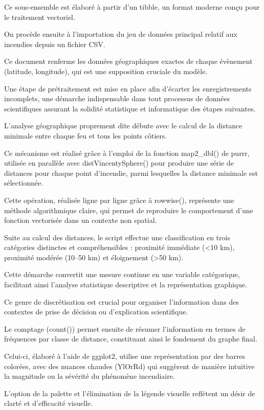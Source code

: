 \documentclass[
]{article}
\begin{document}
Ce sous-ensemble est élaboré à partir d'un tibble, un format moderne
conçu pour le traitement vectoriel.

On procède ensuite à l'importation du jeu de données principal relatif
aux incendies depuis un fichier CSV.

Ce document renferme les données géographiques exactes de chaque
évènement (latitude, longitude), qui est une supposition cruciale du
modèle.

Une étape de prétraitement est mise en place afin d'écarter les
enregistrements incomplets, une démarche indispensable dans tout
processus de données scientifiques assurant la solidité statistique et
informatique des étapes suivantes.

L'analyse géographique proprement dite débute avec le calcul de la
distance minimale entre chaque feu et tous les points côtiers.

Ce mécanisme est réalisé grâce à l'emploi de la fonction map2\_dbl() de
purrr, utilisée en parallèle avec distVincentySphere() pour produire une
série de distances pour chaque point d'incendie, parmi lesquelles la
distance minimale est sélectionnée.

Cette opération, réalisée ligne par ligne grâce à rowwise(), représente
une méthode algorithmique claire, qui permet de reproduire le
comportement d'une fonction vectorisée dans un contexte non spatial.

Suite au calcul des distances, le script effectue une classification en
trois catégories distinctes et compréhensibles : proximité immédiate
(\textless10 km), proximité modérée (10--50 km) et éloignement
(\textgreater50 km).

Cette démarche convertit une mesure continue en une variable
catégorique, facilitant ainsi l'analyse statistique descriptive et la
représentation graphique.

Ce genre de discrétisation est crucial pour organiser l'information dans
des contextes de prise de décision ou d'explication scientifique.

Le comptage (count()) permet ensuite de résumer l'information en termes
de fréquences par classe de distance, constituant ainsi le fondement du
graphe final.

Celui-ci, élaboré à l'aide de ggplot2, utilise une représentation par
des barres colorées, avec des nuances chaudes (YlOrRd) qui suggèrent de
manière intuitive la magnitude ou la sévérité du phénomène incendiaire.

L'option de la palette et l'élimination de la légende visuelle reflètent
un désir de clarté et d'efficacité visuelle.
\end{document}
